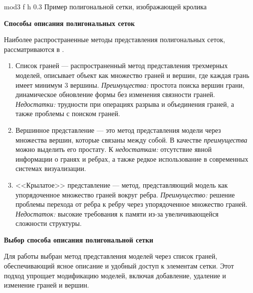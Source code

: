 	{mod3} %
	{f} %
	{h} %
	{0.3\textwidth} %
	{Пример полигональной сетки, изображающей кролика} %


\textbf{Способы описания полигональных сеток}

Наиболее распространенные методы представления полигональных сеток, рассматриваются в \cite{polygon_mesh}.


\begin{enumerate}
	\item Список граней ---  распространенный метод представления трехмерных моделей, описывает объект как множество граней и вершин, где каждая грань имеет минимум 3 вершины.
	\textit{Преимущества:} простота поиска вершин грани, динамическое обновление формы без изменения связности граней.
	\textit{Недостатки:} трудности при операциях разрыва и объединения граней, а также проблемы с поиском граней.
	
	\item Вершинное представление --- это метод представления модели через множества вершин, которые связаны между собой.
	В качестве \textit{преимущества} можно выделить его простату.
	К \textit{недостаткам:} отсутствие явной информации о гранях и ребрах, а также редкое использование в современных системах визуализации.
	
	\item <<Крылатое>> представление --- метод, представляющий модель как упорядоченное множество граней вокруг ребра.
	\textit{Преимущество:} решение проблемы перехода от ребра к ребру через упорядоченное множество граней.
	\textit{Недостаток:} высокие требования к памяти из-за увеличивающейся сложности структуры.
\end{enumerate}


\textbf{Выбор способа описания полигональной сетки} %

Для работы выбран метод представления моделей через список граней, обеспечивающий ясное описание и удобный доступ к элементам сетки.
Этот подход упрощает модификацию моделей, включая добавление, удаление и изменение граней и вершин.


